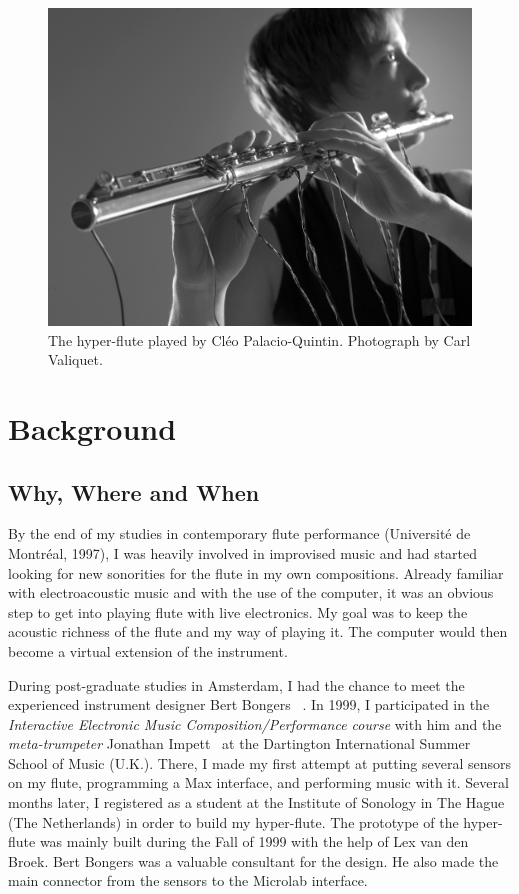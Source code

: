 \begin{figure}[t]
\centering
	\includegraphics[width=\columnwidth]{CleoPQ-portrait.jpg}
\caption{The hyper-flute played by Cl\'{e}o Palacio-Quintin. Photograph by Carl Valiquet.}			
\label{Palacio-Quintin:photo}
\end{figure}


\section{Background}

\subsection{Why, Where and When} 

By the end of my studies in contemporary flute performance (Universit\'{e} de Montr\'{e}al, 1997), I was heavily involved in improvised music and had started looking for new sonorities for the flute in my own compositions.  Already familiar with electroacoustic music and with the use of the computer, it was an obvious step to get into playing flute with live electronics. My goal was to keep the acoustic richness of the flute and my way of playing it.  The computer would then become a virtual extension of the instrument. 

During post-graduate studies in Amsterdam, I had the chance to meet the experienced instrument designer Bert Bongers~ \cite{Bongers:2000}.  In 1999, I participated in the \textit{Interactive Electronic Music Composition/Performance course} with him and the  \textit{meta-trumpeter} Jonathan Impett~ \cite{Impett:1994} at the Dartington International Summer School of Music (U.K.). There, I made my first attempt at putting several sensors on my flute, programming a Max interface, and performing music with it.  Several months later, I registered as a student at the Institute of Sonology in The Hague (The Netherlands) in order to build my hyper-flute. The prototype of the hyper-flute was mainly built during the Fall of 1999 with the help of Lex van den Broek. Bert Bongers was a valuable consultant for the design. He also made the main connector from the sensors to the Microlab interface.

